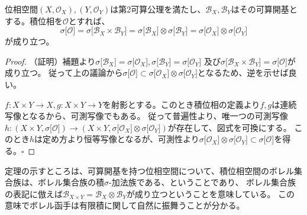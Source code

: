 \documentclass[../root.tex]{subfiles}
\begin{document}
\begin{Thm}{}{}
位相空間$ ( X, \mathcal{O}_{X} ), ( Y, \mathcal{O}_{Y} ) $は第2可算公理を満たし、$ \mathcal{B}_{X}, \mathcal{B}_{Y} $はその可算開基とする。積位相を$ \mathcal{O} $とすれば、
\[ \sigma\lbrack \mathcal{O} \rbrack=\sigma\lbrack \mathcal{B}_{X}\times\mathcal{B}_{Y} \rbrack=\sigma\lbrack \mathcal{B}_{X} \rbrack\otimes\sigma\lbrack \mathcal{B}_{Y} \rbrack=\sigma\lbrack \mathcal{O}_{X} \rbrack\otimes\sigma\lbrack \mathcal{O}_{Y} \rbrack \]
が成り立つ。
\end{Thm}

\begin{proof}
（証明）補題より$ \sigma\lbrack \mathcal{B}_{X} \rbrack=\sigma\lbrack \mathcal{O}_{X} \rbrack, \sigma\lbrack \mathcal{B}_{Y} \rbrack=\sigma\lbrack \mathcal{O}_{Y} \rbrack $
及び$ \sigma\lbrack \mathcal{B}_{X}\times\mathcal{B}_{Y} \rbrack = \sigma\lbrack \mathcal{O} \rbrack $が成り立つ。
従って上の議論から$ \sigma\lbrack \mathcal{O} \rbrack\subset\sigma\lbrack \mathcal{O}_{X} \rbrack\otimes\sigma\lbrack \mathcal{O}_{Y} \rbrack $となるため、逆を示せば良い。

$ f\colon X\times Y\rightarrow X, g\colon X\times Y\rightarrow Y $を射影とする。このとき積位相の定義より$ f, g $は連続写像となるから、可測写像でもある。
従って普遍性より、唯一つの可測写像$ h\colon ( X\times Y, \sigma\lbrack \mathcal{O} \rbrack )\rightarrow ( X\times Y, \sigma\lbrack \mathcal{O}_{X} \rbrack\otimes\sigma\lbrack \mathcal{O}_{Y} \rbrack ) $が存在して、図式を可換にする。
このとき$ h $は定め方より恒等写像となるが、可測性より$ \sigma\lbrack \mathcal{O}_{X} \rbrack\otimes\sigma\lbrack \mathcal{O}_{Y} \rbrack \subset \sigma\lbrack \mathcal{O} \rbrack $を得る。$ \square $
\end{proof}

定理の示すところは、可算開基を持つ位相空間について、積位相空間のボレル集合族は、ボレル集合族の積$ \sigma $-加法族である、ということであり、
ボレル集合族の表記に倣えば$ \mathscr{B}_{X\times Y}=\mathscr{B}_{X}\otimes\mathscr{B}_{Y} $が成り立つということを意味している。
この意味でボレル函手は有限積に関して自然に振舞うことが分かる。
\end{document}
